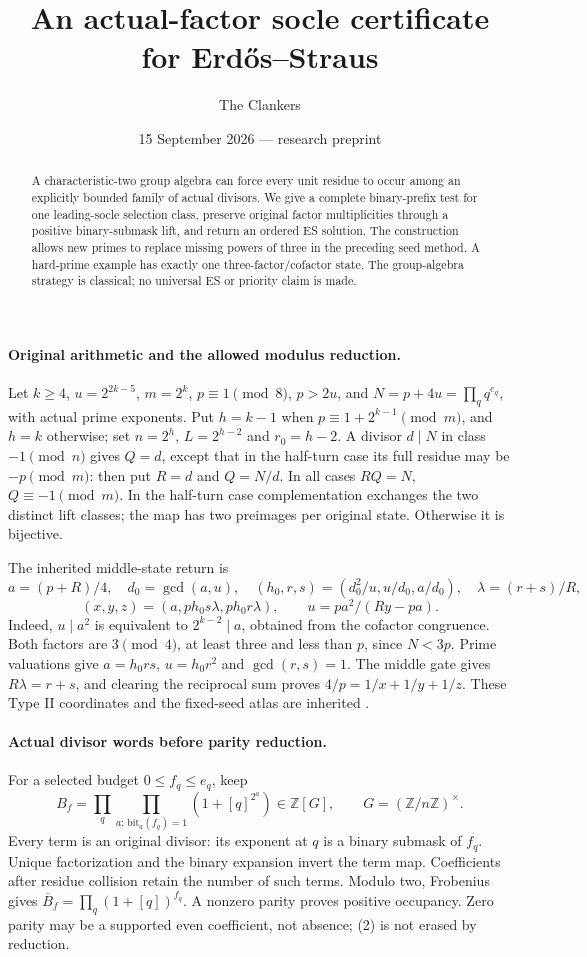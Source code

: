 \documentclass[10pt,a4paper]{article}
\title{An actual-factor socle certificate for Erd\H{o}s--Straus}
\author{The Clankers}
\date{15 September 2026 --- research preprint}
\begin{document}
\maketitle
\begin{abstract}
A characteristic-two group algebra can force every unit residue to occur among
an explicitly bounded family of actual divisors. We give a complete binary-prefix
test for one leading-socle selection class, preserve original factor multiplicities
through a positive binary-submask lift, and return an ordered ES solution.
The construction allows new primes to replace missing powers of three in the
preceding seed method. A hard-prime example has exactly one three-factor/cofactor
state. The group-algebra strategy is classical; no universal ES or priority claim
is made.
\end{abstract}

\paragraph{Original arithmetic and the allowed modulus reduction.}
Let $k\ge4$, $u=2^{2k-5}$, $m=2^k$, $p\equiv1\pmod8$, $p>2u$, and
$N=p+4u=\prod_q q^{e_q}$, with actual prime exponents. Put
$h=k-1$ when $p\equiv1+2^{k-1}\pmod m$, and $h=k$ otherwise; set
$n=2^h$, $L=2^{h-2}$ and $r_0=h-2$.
A divisor $d\mid N$ in class $-1\pmod n$ gives $Q=d$, except that in the
half-turn case its full residue may be $-p\pmod m$: then put $R=d$ and
$Q=N/d$. In all cases $RQ=N$, $Q\equiv-1\pmod m$.
In the half-turn case complementation exchanges the two distinct lift classes;
the map has two preimages per original state. Otherwise it is bijective.

The inherited middle-state return is
\[
 a=(p+R)/4,\quad d_0=\gcd(a,u),\quad
 (h_0,r,s)=(d_0^2/u,u/d_0,a/d_0),\quad \lambda=(r+s)/R,
\]
\[
 (x,y,z)=(a,ph_0s\lambda,ph_0r\lambda),\qquad
 u=pa^2/(Ry-pa).                                             \tag{1}
\]
Indeed, $u\mid a^2$ is equivalent to $2^{k-2}\mid a$, obtained from the
cofactor congruence. Both factors are $3\pmod4$, at least three and less than
$p$, since $N<3p$. Prime valuations give $a=h_0rs$, $u=h_0r^2$ and
$\gcd(r,s)=1$. The middle gate gives $R\lambda=r+s$, and clearing the
reciprocal sum proves $4/p=1/x+1/y+1/z$. These Type II coordinates and the
fixed-seed atlas are inherited \cite{ET,Prior}.

\paragraph{Actual divisor words before parity reduction.}
For a selected budget $0\le f_q\le e_q$, keep
\[
 B_f=\prod_q\prod_{a:\,\mathrm{bit}_a(f_q)=1}(1+[q]^{2^a})\in\mathbb Z[G],
 \qquad G=(\mathbb Z/n\mathbb Z)^\times.                      \tag{2}
\]
Every term is an original divisor: its exponent at $q$ is a binary submask
of $f_q$. Unique factorization and the binary expansion invert the term map.
Coefficients after residue collision retain the number of such terms.
Modulo two, Frobenius gives $\overline B_f=\prod_q(1+[q])^{f_q}$.
A nonzero parity proves positive occupancy. Zero parity may be a supported
even coefficient, not absence; (2) is not erased by reduction.
\end{document}
